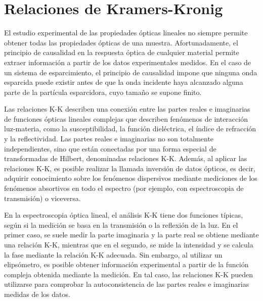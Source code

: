 

\section{Relaciones de Kramers-Kronig}
\label{section:yth}

El estudio experimental de las propiedades ópticas lineales no siempre permite obtener todas las propiedades ópticas de una muestra. Afortunadamente, el principio de causalidad en la respuesta óptica de cualquier material permite extraer información a partir de los datos experimentales medidos. En el caso de un sistema de esparcimiento, el principio de causalidad impone que ninguna onda esparcida puede existir antes de que la onda incidente haya alcanzado alguna parte de la partícula esparcidora, cuyo tamaño se supone finito.

Las relaciones K-K describen una conexión entre las partes reales e imaginarias de funciones ópticas lineales complejas que describen fenómenos de interacción luz-materia, como la susceptibilidad, la función dieléctrica, el índice de refracción y la reflectividad. Las partes reales e imaginarias no son totalmente independientes, sino que están conectadas por una forma especial de transformadas de Hilbert, denominadas relaciones K-K.  Además, al aplicar las relaciones K-K, es posible realizar la llamada inversión de datos ópticos, es decir, adquirir conocimiento sobre los fenómenos dispersivos mediante mediciones de los fenómenos absortivos en todo el espectro (por ejemplo, con espectroscopia de transmisión) o viceversa. 

En la espectroscopia óptica lineal, el análisis K-K tiene dos funciones típicas, según si la medición se basa en la transmisión o la reflexión de la luz. En el primer caso, se suele medir la parte imaginaria y la parte real se obtiene mediante una relación K-K, mientras que en el segundo, se mide la intensidad y se calcula la fase mediante la relación K-K adecuada.
Sin embargo, al utilizar un elipsómetro, es posible obtener información experimental a partir de la función compleja obtenida mediante la medición. En tal caso, las relaciones K-K pueden utilizarse para comprobar la autoconsistencia de las partes reales e imaginarias medidas de los datos.